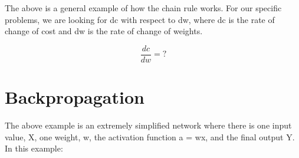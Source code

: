 \vspace{7.5mm}

The above is a general example of how the chain rule works. For our specific problems, we are looking for dc with respect to dw, where dc is the rate of change of cost and dw is the rate of change of weights.

\[\frac{dc}{dw} = ?\]
%


\section{Backpropagation}

\begin{center}
\end{center}

The above example is an extremely simplified network where there is one input value, X, one weight, w, the activation function a = wx, and the final output Y. In this example: 

